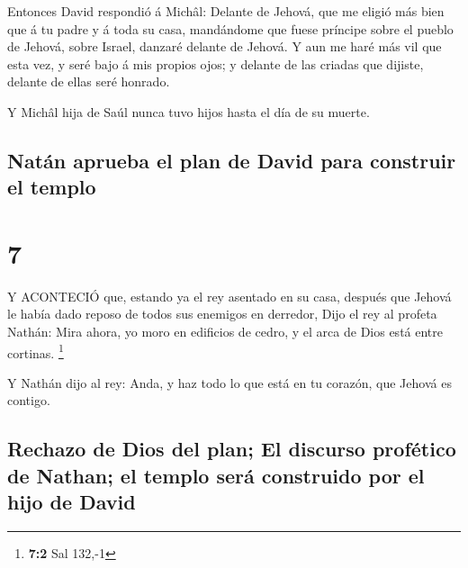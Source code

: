  Entonces David respondió á Michâl: Delante de Jehová, que
me eligió más bien que á tu padre y á toda su casa, mandándome que fuese
príncipe sobre el pueblo de Jehová, sobre Israel, danzaré delante de
Jehová.  Y aun me haré más vil que esta vez, y seré bajo á
mis propios ojos; y delante de las criadas que dijiste, delante de ellas
seré honrado.

 Y Michâl hija de Saúl nunca tuvo hijos hasta el día de su
muerte.

\hypertarget{natuxe1n-aprueba-el-plan-de-david-para-construir-el-templo}{%
\subsection{Natán aprueba el plan de David para construir el
templo}\label{natuxe1n-aprueba-el-plan-de-david-para-construir-el-templo}}

\hypertarget{section-6}{%
\section{7}\label{section-6}}

 Y ACONTECIÓ que, estando ya el rey asentado en su casa,
después que Jehová le había dado reposo de todos sus enemigos en
derredor,  Dijo el rey al profeta Nathán: Mira ahora, yo
moro en edificios de cedro, y el arca de Dios está entre cortinas.
\footnote{\textbf{7:2} Sal 132,-1}

 Y Nathán dijo al rey: Anda, y haz todo lo que está en tu
corazón, que Jehová es contigo.

\hypertarget{rechazo-de-dios-del-plan-el-discurso-profuxe9tico-de-nathan-el-templo-seruxe1-construido-por-el-hijo-de-david}{%
\subsection{Rechazo de Dios del plan; El discurso profético de Nathan;
el templo será construido por el hijo de
David}\label{rechazo-de-dios-del-plan-el-discurso-profuxe9tico-de-nathan-el-templo-seruxe1-construido-por-el-hijo-de-david}}

